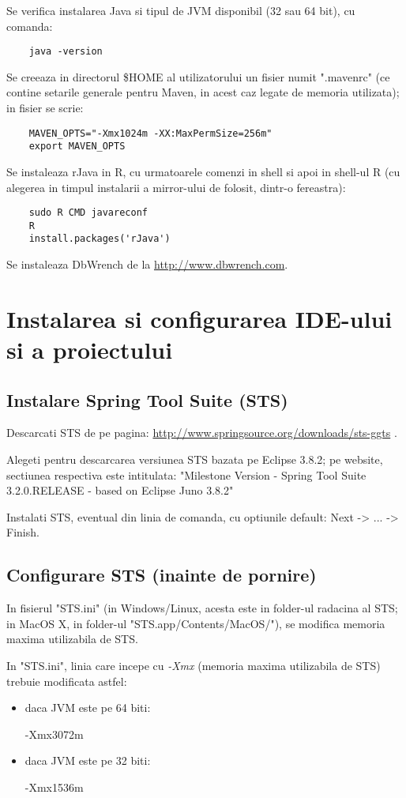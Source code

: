 Se verifica instalarea Java si tipul de JVM disponibil (32 sau 64 bit), cu comanda:
\begin{lstlisting}
	java -version
\end{lstlisting}

Se creeaza in directorul \$HOME al utilizatorului un fisier numit ".mavenrc"
(ce contine setarile generale pentru Maven, in acest caz legate de memoria utilizata);
in fisier se scrie:
\begin{lstlisting}
	MAVEN_OPTS="-Xmx1024m -XX:MaxPermSize=256m"
	export MAVEN_OPTS
\end{lstlisting}

Se instaleaza rJava in R, cu urmatoarele comenzi in shell si apoi in shell-ul R
(cu alegerea in timpul instalarii a mirror-ului de folosit, dintr-o fereastra):
\begin{lstlisting}
	sudo R CMD javareconf
	R
	install.packages('rJava')
\end{lstlisting}

Se instaleaza DbWrench de la \url{http://www.dbwrench.com}.

\section{Instalarea si configurarea IDE-ului si a proiectului}

\subsection{Instalare Spring Tool Suite (STS)}
Descarcati STS de pe pagina:
\url{http://www.springsource.org/downloads/sts-ggts} .

Alegeti pentru descarcarea versiunea STS bazata pe Eclipse 3.8.2; pe website,
sectiunea respectiva este intitulata:
"Milestone Version - Spring Tool Suite 3.2.0.RELEASE - based on Eclipse Juno 3.8.2"

Instalati STS, eventual din linia de comanda, cu optiunile default: 
Next -> ... -> Finish.

\subsection{Configurare STS (inainte de pornire)}
In fisierul "STS.ini" (in Windows/Linux, acesta este in folder-ul radacina al STS; in MacOS X, in folder-ul "STS.app/Contents/MacOS/"),
se modifica memoria maxima utilizabila de STS.

In "STS.ini", linia care incepe cu \emph{-Xmx} (memoria maxima utilizabila de
STS) trebuie modificata astfel:
\begin{itemize} 
\item daca JVM este pe 64 biti:

	-Xmx3072m
\item daca JVM este pe 32 biti:

	-Xmx1536m
\end{itemize}

